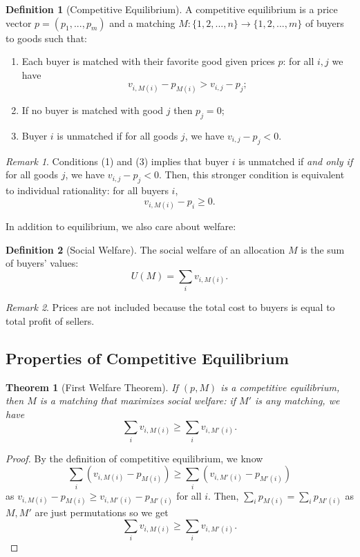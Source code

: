 \documentclass[dvipsnames]{article}
\newtheorem{theorem}{Theorem}[section]
\theoremstyle{definition}
\newtheorem{definition}{Definition}[section]
\theoremstyle{remark}
\newtheorem*{remark}{Remark}
\begin{document}
\begin{definition}[Competitive Equilibrium]
	A competitive equilibrium is a price vector $p = (p_1,...,p_m)$ and a matching $M: \{1,2,...,n\} \to \{1,2,...,m\}$ of buyers to goods such that:
	\begin{enumerate}
		\item Each buyer is matched with their favorite good given prices $p$: for all $i,j$ we have
		$$v_{i,M(i)} - p_{M(i)} > v_{i,j} - p_j;$$
		\item If no buyer is matched with good $j$ then $p_j = 0$;
		\item Buyer $i$ is unmatched if for all goods $j$, we have $v_{i,j} - p_j < 0$.
	\end{enumerate}
\end{definition}

\begin{remark}
	Conditions (1) and (3) implies that buyer $i$ is unmatched if \textit{and only if} for all goods $j$, we have $v_{i,j} - p_j < 0$. Then, this stronger condition is equivalent to individual rationality: for all buyers $i$,
	$$v_{i,M(i)} - p_i \geq 0.$$
\end{remark}

In addition to equilibrium, we also care about welfare:

\begin{definition}[Social Welfare]
	The social welfare of an allocation $M$ is the sum of buyers' values:
	$$U(M) = \sum_i v_{i,M(i)}.$$
\end{definition}

\begin{remark}
	Prices are not included because the total cost to buyers is equal to total profit of sellers.
\end{remark}

\subsection{Properties of Competitive Equilibrium}

\begin{theorem}[First Welfare Theorem]
	If $(p,M)$ is a competitive equilibrium, then $M$ is a matching that maximizes social welfare: if $M'$ is any matching, we have
	$$\sum_i v_{i,M(i)} \geq \sum_i v_{i,M'(i)}.$$
\end{theorem}

\begin{proof}
	By the definition of competitive equilibrium, we know
	$$\sum_i (v_{i,M(i)}-p_{M(i)}) \geq \sum_i (v_{i,M'(i)}-p_{M'(i)})$$
	as $v_{i,M(i)}-p_{M(i)} \geq v_{i,M'(i)}-p_{M'(i)}$ for all $i$. Then, $\sum_i p_{M(i)} = \sum_i p_{M'(i)}$ as $M,M'$ are just permutations so we get
	$$\sum_i v_{i,M(i)} \geq \sum_i v_{i,M'(i)}.$$
\end{proof}
\end{document}
